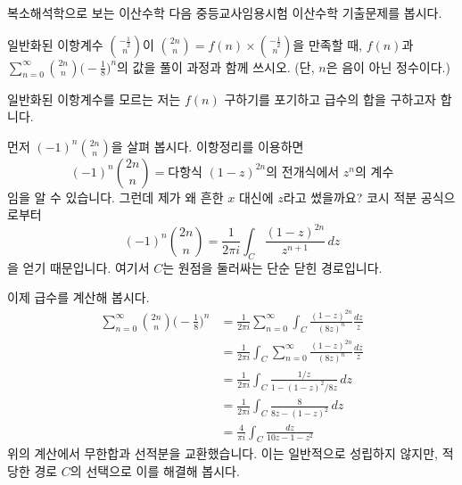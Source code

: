 \documentclass[serif]{beamer}
\begin{document}
\begin{frame}{복소해석학으로 보는 이산수학}
    다음 중등교사임용시험 이산수학 기출문제를 봅시다.

    \begin{hint}[2021학년도 전공 A 7번]
        일반화된 이항계수 $\displaystyle\binom{-\frac{1}{2}}{n}$이 $\displaystyle\binom{2n}{n}=f(n)\times\binom{-\frac{1}{2}}{n}$을 만족할 때, $f(n)$과 $\displaystyle\sum_{n=0}^\infty\binom{2n}{n}\biggl(-\frac{1}{8}\biggr)^n$의 값을 풀이 과정과 함께 쓰시오. (단, $n$은 음이 아닌 정수이다.)
    \end{hint}

    일반화된 이항계수를 모르는 저는 $f(n)$ 구하기를 포기하고 급수의 합을 구하고자 합니다.
\end{frame}

\begin{frame}{}
    먼저 $\displaystyle(-1)^n\binom{2n}{n}$을 살펴 봅시다. 이항정리를 이용하면
    \[
        (-1)^n\binom{2n}{n}=\text{다항식 }(1-z)^{2n}\text{의 전개식에서 } z^n\text{의 계수}
    \]
    임을 알 수 있습니다. 그런데 제가 왜 흔한 $x$ 대신에 $z$라고 썼을까요? 코시 적분 공식으로부터
    \[
        (-1)^n\binom{2n}{n}=\frac{1}{2\pi i}\int_C\frac{(1-z)^{2n}}{z^{n+1}}\,dz
    \]
    을 얻기 때문입니다. 여기서 $C$는 원점을 둘러싸는 단순 닫힌 경로입니다.
\end{frame}

\begin{frame}{}
    이제 급수를 계산해 봅시다.
    \[
        \begin{aligned}
            \sum_{n=0}^\infty\binom{2n}{n}\biggl(-\frac{1}{8}\biggr)^n&=\frac{1}{2\pi i}\sum_{n=0}^\infty\int_C \frac{(1-z)^{2n}}{(8z)^n}\frac{dz}{z}\\
            &=\frac{1}{2\pi i}\int_C\sum_{n=0}^\infty\frac{(1-z)^{2n}}{(8z)^n}\frac{dz}{z}\\
            &=\frac{1}{2\pi i}\int_C\frac{1/z}{1-(1-z)^2/8z}\,dz\\
            &=\frac{1}{2\pi i}\int_C\frac{8}{8z-(1-z)^2}\,dz\\
            &=\frac{4}{\pi i}\int_C\frac{dz}{10z-1-z^2}
        \end{aligned}
    \]
    위의 계산에서 무한합과 선적분을 교환했습니다. 이는 일반적으로 성립하지 않지만, 적당한 경로 $C$의 선택으로 이를 해결해 봅시다.
\end{frame}
\end{document}
